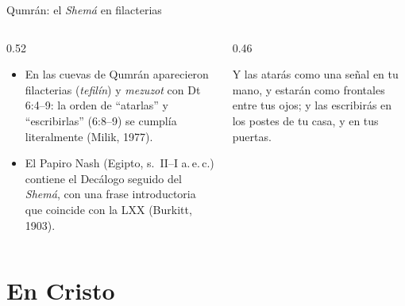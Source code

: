\begin{frame}{Qumrán: el \emph{Shemá} en filacterias}
\begin{columns}[t,onlytextwidth]
\begin{column}{0.52\textwidth}\small
\begin{itemize}
\item En las cuevas de Qumrán aparecieron filacterias (\emph{tefilín}) y \emph{mezuzot} con Dt 6:4--9: la orden de ``atarlas'' y ``escribirlas'' (6:8--9) se cumplía literalmente (Milik, 1977).
\item El Papiro Nash (Egipto, s.~II--I a.\,e.\,c.) contiene el Decálogo seguido del \emph{Shemá}, con una frase introductoria que coincide con la LXX (Burkitt, 1903).
\end{itemize}
\end{column}
\begin{column}{0.46\textwidth}
\begin{cita}[fontupper=\scriptsize\itshape]Y las atarás como una señal en tu mano, y estarán como frontales entre tus ojos; y las escribirás en los postes de tu casa, y en tus puertas.\end{cita}
\end{column}
\end{columns}
\end{frame}

\section{En Cristo}

